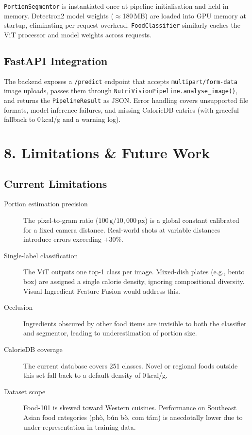 \documentclass[fleqn,10pt]{SelfArx}
\begin{document}
\texttt{PortionSegmentor} is instantiated once at pipeline initialisation and held in memory. Detectron2 model weights ($\approx$180\,MB) are loaded into GPU memory at startup, eliminating per-request overhead. \texttt{FoodClassifier} similarly caches the ViT processor and model weights across requests.

\subsection{FastAPI Integration}

The backend exposes a \texttt{/predict} endpoint that accepts \texttt{multipart/form-data} image uploads, passes them through \texttt{NutriVisionPipeline.analyse\_image()}, and returns the \texttt{PipelineResult} as JSON. Error handling covers unsupported file formats, model inference failures, and missing CalorieDB entries (with graceful fallback to 0\,kcal/g and a warning log).

\section{8. Limitations \& Future Work}

\subsection{Current Limitations}

\begin{description}
    \item[Portion estimation precision] The pixel-to-gram ratio ($100\,\text{g}/10{,}000\,\text{px}$) is a global constant calibrated for a fixed camera distance. Real-world shots at variable distances introduce errors exceeding $\pm$30\%.

    \item[Single-label classification] The ViT outputs one top-1 class per image. Mixed-dish plates (e.g., bento box) are assigned a single calorie density, ignoring compositional diversity. Visual-Ingredient Feature Fusion \cite{qi2025vif} would address this.

    \item[Occlusion] Ingredients obscured by other food items are invisible to both the classifier and segmentor, leading to underestimation of portion size.

    \item[CalorieDB coverage] The current database covers 251 classes. Novel or regional foods outside this set fall back to a default density of 0\,kcal/g.

    \item[Dataset scope] Food-101 is skewed toward Western cuisines. Performance on Southeast Asian food categories (ph\`o, b\'un b\`o, com t\'am) is anecdotally lower due to under-representation in training data.
\end{description}
\end{document}

